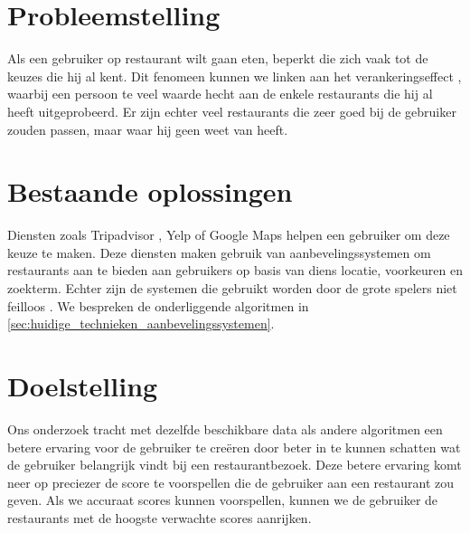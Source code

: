 
\section{Probleemstelling}
Als een gebruiker op restaurant wilt gaan eten, beperkt die zich vaak tot de keuzes die hij al kent. Dit fenomeen kunnen we linken aan het verankeringseffect \cite{anchoring_effect}, waarbij een persoon te veel waarde hecht aan de enkele restaurants die hij al heeft uitgeprobeerd. Er zijn echter veel restaurants die zeer goed bij de gebruiker zouden passen, maar waar hij geen weet van heeft.

\section{Bestaande oplossingen}
Diensten zoals Tripadvisor \cite{tripadvisor_algorithm}, Yelp of Google Maps helpen een gebruiker om deze keuze te maken. Deze diensten maken gebruik van aanbevelingssystemen om restaurants aan te bieden aan gebruikers op basis van diens locatie, voorkeuren en zoekterm. Echter zijn de systemen die gebruikt worden door de grote spelers niet feilloos \cite{spotify_recsys_bad}. We bespreken de onderliggende algoritmen in \autoref{sec:huidige_technieken_aanbevelingssystemen}.

\section{Doelstelling}
Ons onderzoek tracht met dezelfde beschikbare data als andere algoritmen een betere ervaring voor de gebruiker te creëren door beter in te kunnen schatten wat de gebruiker belangrijk vindt bij een restaurantbezoek. Deze betere ervaring komt neer op preciezer de score te voorspellen die de gebruiker aan een restaurant zou geven. Als we accuraat scores kunnen voorspellen, kunnen we de gebruiker de restaurants met de hoogste verwachte scores aanrijken.
